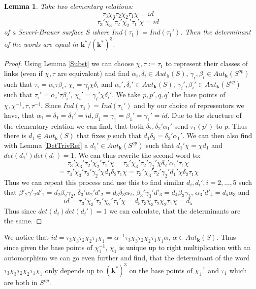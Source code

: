 \documentclass[12pt, oneside, reqno]{amsart}
\newtheorem{lemma}[theorem]{Lemma}
\begin{document}
\begin{lemma} \label{DepPoint}
     Take two elementary relations:
     \[\tau_3\chi_3\tau_2\chi_2\tau_1\chi = id\]
     \[\tau_3'\chi_3'\tau_2'\chi_2'\tau_1'\chi = id\]
     of a Severi-Brauer surface $S$ where $Ind(\tau_1) = Ind(\tau_1')$. Then the determinant of the words are equal in $\textbf{k}^*/(\textbf{k}^*)^3$. 
\end{lemma}
\begin{proof}
    Using Lemma \ref{Subst} we can choose $\chi, \tau := \tau_1$ to represent their classes of links (even if $\chi, \tau$ are equivalent) and find $\alpha_i, \delta_i \in Aut_{\textbf{k}}(S), \, \gamma_i, \beta_i \in Aut_{\textbf{k}}(S^{op}) $ such that $\tau_i = \alpha_i \tau \beta_i, \, \chi_i = \gamma_i \chi \delta_i$ and $\alpha_i', \delta_i' \in Aut_{\textbf{k}}(S), \, \gamma_i', \beta_i' \in Aut_{\textbf{k}}(S^{op})$ such that $\tau_i' = \alpha_i' \tau \beta_i', \, \chi_i' = \gamma_i' \chi \delta_i'$. We take $p,p',q,q'$ the base points of $\chi, \chi^{-1},\tau,\tau^{-1}$. Since $Ind(\tau_1) = Ind(\tau_1')$ and by our choice of representors we have, that $\alpha_1 = \delta_1 =  \delta_1' =id, \beta_1=\gamma_1=\beta_1'= \gamma_1' = id$. Due to the structure of the elementary relation we can find, that both $\delta_2, \delta_2'\alpha_1'$ send $\tau_1(p')$ to $p$. Thus there is $d_1 \in Aut_{\textbf{k}}(S)$ that fixes $p$ such that $d_1\delta_2 = \delta_2'\alpha_1'$. We can then also find with Lemma \ref{DetTrivRef} a $d_1' \in Aut_{\textbf{k}}(S^{op})$ such that $d_1' \chi = \chi d_1$ and $det(d_1')det(d_1) = 1$. We can thus rewrite the second word to: 
    \[\tau_3'\chi_3'\tau_2'\chi_2'\tau_1'\chi = \tau_3'\chi_3'\tau_2'\gamma_2'\chi\delta_2'\alpha_1'\tau_1\chi\] \[= \tau_3'\chi_3'\tau_2'\gamma_2'\chi d_1\delta_2\tau_1\chi = \tau_3'\chi_3'\tau_2'\gamma_2'd_1'\chi \delta_2\tau_1\chi\]
    Thus we can repeat this process and use this to find similar $d_i,d_i', i = 2, \dots ,5$ such that $\beta'_2\gamma'_2 d'_1 = d_2 \beta_2 \gamma_2 , \, \delta_3'\alpha_{2}'d'_{2} = d_{3} \delta_3\alpha_2, \, \beta_3'\gamma_3' d'_{3} = d_{4} \beta_3 \gamma_3, \, \alpha_3'd'_{4} = d_5 \alpha_3$ and \[id = \tau_3'\chi_3'\tau_2'\chi_2'\tau_1'\chi = d_5\tau_3\chi_3\tau_2\chi_2\tau_1\chi = d_5\]
    Thus since $det(d_i)det(d_i')=1$ we can calculate, that the determinants are the same.
\end{proof}
\noindent We notice that $id = \tau_3\chi_3\tau_2\chi_2\tau_1\chi_1 = \alpha^{-1}\tau_3\chi_3\tau_2\chi_2\tau_1\chi_1 \alpha, \, \alpha \in Aut_{\textbf{k}}(S)$. Thus since given the base points of $\chi_1^{-1}$, $\chi_1$ is unique up to right multiplication with an automorphism we can go even further and find, that the determinant of the word $\tau_3 \chi_3 \tau_2\chi_2 \tau_1 \chi_1$ only depends up to $(\textbf{k}^*)^3$ on the base points of $\chi_1^{-1}$ and $\tau_1$ which are both in $S^{op}$.
\end{document}
